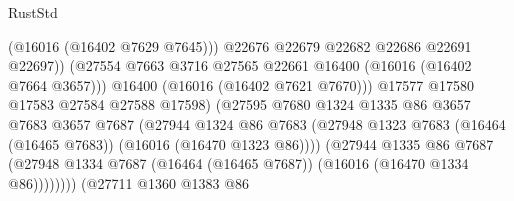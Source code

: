 \begin{lexlean}{RustStd}
\begin{coremodule}
                                              (@16016 (@16402 @7629 @7645)))
                                            @22676
                                            @22679
                                            @22682
                                            @22686
                                            @22691
                                            @22697))
                                        (@27554
                                          @7663
                                          @3716
                                          @27565
                                          @22661
                                          @16400
                                          (@16016 (@16402 @7664 @3657)))
                                        @16400
                                        (@16016 (@16402 @7621 @7670)))
                                      @17577
                                      @17580
                                      @17583
                                      @27584
                                      @27588
                                      @17598)
                                    (@27595
                                      @7680
                                      @1324
                                      @1335
                                      @86
                                      @3657
                                      @7683
                                      @3657
                                      @7687
                                      (@27944
                                        @1324
                                        @86
                                        @7683
                                        (@27948
                                          @1323
                                          @7683
                                          (@16464 (@16465 @7683))
                                          (@16016 (@16470 @1323 @86))))
                                      (@27944
                                        @1335
                                        @86
                                        @7687
                                        (@27948
                                          @1334
                                          @7687
                                          (@16464 (@16465 @7687))
                                          (@16016 (@16470 @1334 @86))))))))
                              (@27711
                                @1360
                                @1383
                                @86

\end{coremodule}
\end{lexlean}

